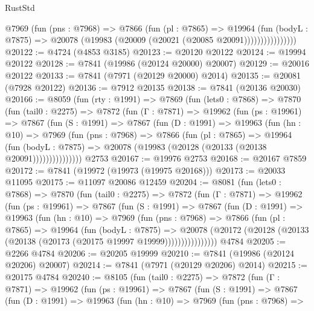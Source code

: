 \begin{lexlean}{RustStd}
\begin{coremodule}
                    @7969
                      (fun (pns : @7968) =>
                      @7866
                        (fun (pl : @7865) =>
                        @19964
                          (fun (bodyL : @7875) =>
                          @20078 (@19983 (@20009 (@20021 (@20085 @20091))))))))))))))))
@20122 := @4724 (@4853 @3185)
@20123 := @20120 @20122
@20124 := @19994 @20122
@20128 := @7841 (@19986 (@20124 @20000) @20007)
@20129 := @20016 @20122
@20133 := @7841 (@7971 (@20129 @20000) @2014)
@20135 := @20081 (@7928 @20122)
@20136 := @7912 @20135
@20138 := @7841 (@20136 @20030)
@20166 := @8059
    (fun (rty : @1991) =>
    @7869
      (fun (lets0 : @7868) =>
      @7870
        (fun (tail0 : @2275) =>
        @7872
          (fun (Γ : @7871) =>
          @19962
            (fun (ps : @19961) =>
            @7867
              (fun (S : @1991) =>
              @7867
                (fun (D : @1991) =>
                @19963
                  (fun (hn : @10) =>
                  @7969
                    (fun (pns : @7968) =>
                    @7866
                      (fun (pl : @7865) =>
                      @19964
                        (fun (bodyL : @7875) =>
                        @20078 (@19983 (@20128 (@20133 (@20138 @20091)))))))))))))))
    @2753
@20167 := @19976 @2753
@20168 := @20167 @7859
@20172 := @7841 (@19972 (@19973 (@19975 @20168)))
@20173 := @20033 @11095
@20175 := @11097 @20086 @12459
@20204 := @8081
    (fun (lets0 : @7868) =>
    @7870
      (fun (tail0 : @2275) =>
      @7872
        (fun (Γ : @7871) =>
        @19962
          (fun (ps : @19961) =>
          @7867
            (fun (S : @1991) =>
            @7867
              (fun (D : @1991) =>
              @19963
                (fun (hn : @10) =>
                @7969
                  (fun (pns : @7968) =>
                  @7866
                    (fun (pl : @7865) =>
                    @19964
                      (fun (bodyL : @7875) =>
                      @20078
                        (@20172
                          (@20128 (@20133 (@20138 (@20173 (@20175 @19997 @19999))))))))))))))))
    @4784
@20205 := @2266 @4784
@20206 := @20205 @19999
@20210 := @7841 (@19986 (@20124 @20206) @20007)
@20214 := @7841 (@7971 (@20129 @20206) @2014)
@20215 := @20175 @4784
@20240 := @8105
    (fun (tail0 : @2275) =>
    @7872
      (fun (Γ : @7871) =>
      @19962
        (fun (ps : @19961) =>
        @7867
          (fun (S : @1991) =>
          @7867
            (fun (D : @1991) =>
            @19963
              (fun (hn : @10) =>
              @7969
                (fun (pns : @7968) =>

\end{coremodule}
\end{lexlean}
